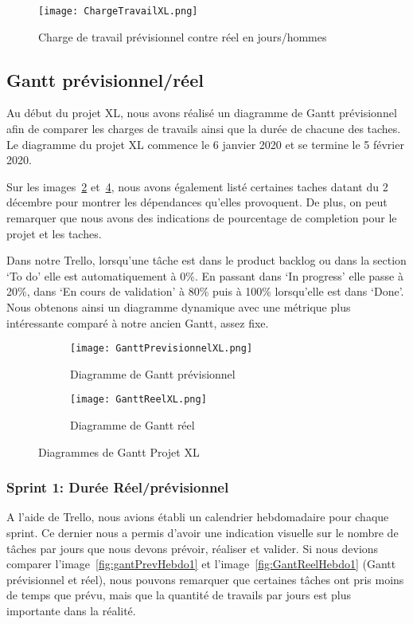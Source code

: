 \begin{figure}[h!]
  \centering
  \texttt{[image: ChargeTravailXL.png]}
	\caption[]{Charge de travail prévisionnel contre réel en jours/hommes}
	\label{fig:chargeReel}
\end{figure}



\subsection{Gantt prévisionnel/réel}
Au début du projet XL, nous avons réalisé un diagramme de Gantt prévisionnel afin de comparer les charges de travails ainsi que la durée de chacune des taches.
Le diagramme du projet XL commence le 6 janvier 2020 et se termine le 5 février 2020. 

Sur les images~\ref{fig:gantXLprev} et~\ref{fig:gantXLreel}, nous avons également listé certaines taches datant du 2 décembre pour montrer les dépendances qu'elles provoquent.
De plus, on peut remarquer que nous avons des indications de pourcentage de completion pour le projet et les taches.

Dans notre Trello, lorsqu'une tâche est dans le product backlog ou dans la section `To do' elle est automatiquement à 0\%.
En passant dans `In progress' elle passe à 20\%, dans `En cours de validation' à 80\% puis à 100\% lorsqu'elle est dans `Done'.
Nous obtenons ainsi un diagramme dynamique avec une métrique plus intéressante comparé à notre ancien Gantt, assez fixe.

\begin{figure}
   \centering
   \begin{subfigure}{.5\textwidth}
     \centering
     \texttt{[image: GanttPrevisionnelXL.png]}
   	\caption{Diagramme de Gantt prévisionnel}
   	\label{fig:gantXLprev}
   \end{subfigure}%
   \begin{subfigure}{.5\textwidth}
     \centering
     \texttt{[image: GanttReelXL.png]}
   	\caption{Diagramme de Gantt réel}
   	\label{fig:gantXLreel}
   \end{subfigure}
   \caption{Diagrammes de Gantt Projet XL}
\end{figure}

\subsubsection{Sprint 1: Durée Réel/prévisionnel}
A l'aide de Trello, nous avions établi un calendrier hebdomadaire pour chaque sprint.
Ce dernier nous a permis d’avoir une indication visuelle sur le nombre de tâches par jours que nous devons prévoir, réaliser et valider.
Si nous devions comparer l'image~\ref{fig:gantPrevHebdo1} et l'image~\ref{fig:GantReelHebdo1} (Gantt prévisionnel et réel), nous pouvons remarquer que certaines tâches ont pris moins de temps que prévu, mais que la quantité de travails par jours est plus importante dans la réalité.


